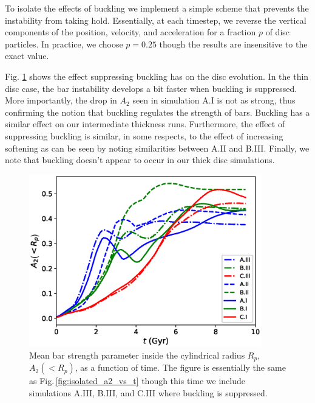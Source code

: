 To isolate the effects of buckling we implement a simple scheme
that prevents the instability from taking hold.  Essentially, at
each timestep, we reverse the vertical components of the position,
velocity, and acceleration for a fraction $p$ of disc particles.
In practice, we choose $p=0.25$ though the results are insensitive
to the exact value.

Fig. \ref{fig:isolated_a2_vs_t_no_buckle} shows the effect suppressing
buckling has on the disc evolution.  In the thin disc case, the bar
instability develops a bit faster when buckling is suppressed.  More
importantly, the drop in $A_2$ seen in simulation A.I is not as strong,
thus confirming the notion that buckling regulates the strength of
bars.  Buckling has a similar effect on our intermediate thickness
runs.  Furthermore, the effect of suppressing buckling is similar, in
some respects, to the effect of increasing softening as can be seen by
noting similarities between A.II and B.III.  Finally, we note that
buckling doesn't appear to occur in our thick disc simulations.

\begin{figure}
	\centering
	\includegraphics[width=0.9\textwidth]
{../figures/isolated_a2_vs_t_2rd_no_buckling_weighted.eps}
	\caption{Mean bar strength parameter inside the cylindrical
          radius $R_p$, $A_2(<R_p)$, as a function of time.  The
          figure is essentially the same as
          Fig.\,\ref{fig:isolated_a2_vs_t} though this time we include
          simulations A.III, B.III, and C.III where buckling is
          suppressed.} \label{fig:isolated_a2_vs_t_no_buckle}
\end{figure}


